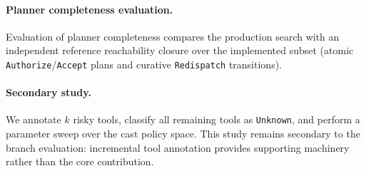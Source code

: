 \paragraph{Planner completeness evaluation.}
Evaluation of planner completeness compares the production search with an independent reference reachability closure over the implemented subset (atomic \texttt{Authorize}/\texttt{Accept} plans and curative \texttt{Redispatch} transitions).

\paragraph{Secondary study.}
We annotate $k$ risky tools, classify all remaining tools as \texttt{Unknown}, and perform a parameter sweep over the cast policy space. This study remains secondary to the branch evaluation: incremental tool annotation provides supporting machinery rather than the core contribution.
